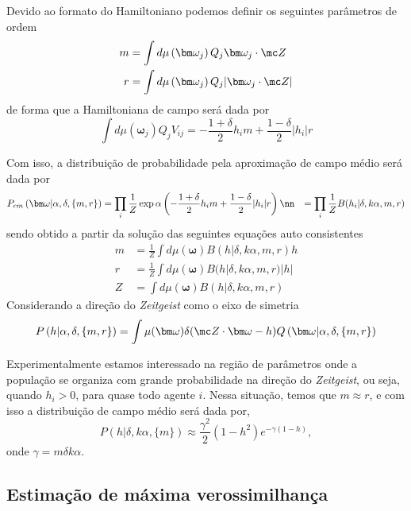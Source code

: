 Devido ao formato do Hamiltoniano podemos definir os seguintes
parâmetros de ordem 
\begin{align}
m &= \int d \mu \left(\bm \omega_j\right)
Q_j\bm \omega_j\cdot \mc Z \nonumber \\
r &= \int d \mu \left(\bm \omega_j\right)
Q_j|\bm \omega_j\cdot\mc Z |\nonumber
\end{align}
de forma que a Hamiltoniana de campo  será dada por
\[
\int d \mu \left(\bm \omega_j\right) Q_jV_{ij} = -\frac{1+\delta}{2}h_i m
+\frac{1-\delta}{2}|h_i| r 
\]

Com isso, a distribuição de probabilidade pela aproximação de campo
médio será dada por
\begin{align}
    P_{cm}\left(\bm \omega |\alpha,\delta, \{m,r\}\right) 
    &= \prod_i\frac{1}{Z} \exp \alpha 
    \left( -\frac{1+\delta}{2}h_i m +\frac{1-\delta}{2}|h_i| r\right)\nn
    &= \prod_i\frac{1}{Z} B(h_i|\delta,k\alpha,m,r)
\end{align}
sendo obtido a partir da solução das seguintes equações
auto consistentes
\begin{align}
m &= \frac{1}{Z}\int d \mu\left(\bm \omega\right)
         B(h|\delta,k\alpha,m,r)h\\ 
r &= \frac{1}{Z}\int d \mu\left(\bm \omega\right)
          B(h|\delta,k\alpha,m,r)|h|\\
Z &=  \int d \mu\left(\bm \omega\right) 
            B(h|\delta,k\alpha,m,r)
\end{align}
Considerando a direção do \textit{Zeitgeist} como o eixo de simetria 
\begin{equation}
    P\left(h|\alpha,\delta, \{m,r\}\right) = \int\mu(\bm \omega)
    \delta(\mc Z \cdot \bm \omega - h ) 
    Q\left(\bm \omega |\alpha,\delta, \{m,r\}\right) 
\end{equation}

Experimentalmente estamos interessado na região de parâmetros onde a população
se organiza com grande probabilidade na direção do \textit{Zeitgeist}, ou seja,
quando $h_i>0$, para quase todo agente $i$. Nessa situação, temos que $m\approx
r$, e com isso a distribuição de campo médio será dada por, 
\begin{equation}
    P(h|\delta, k \alpha,\{m\}) \approx
    \frac{\gamma^2}{2} \left(1 - h^2\right) e^{-\gamma (1- h )},
    \label{eq:pgamma}
\end{equation}
onde $\gamma = m \delta k \alpha$.

\subsection{Estimação de máxima verossimilhança} %
\label{sub:maxver}

